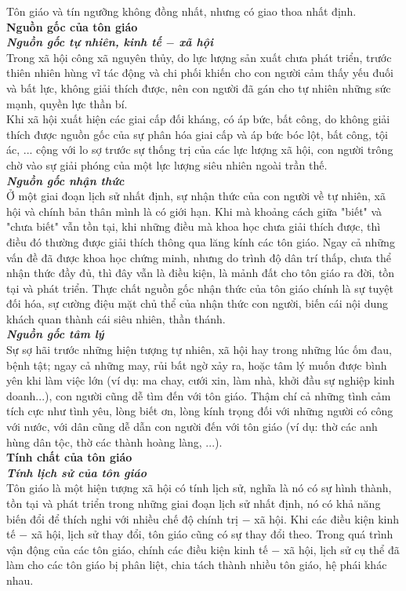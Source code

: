 Tôn giáo và tín ngưỡng không đồng nhất, nhưng có giao thoa nhất định.\\
\textbf{Nguồn gốc của tôn giáo}\\
\textbf{\textit{Nguồn gốc tự nhiên, kinh tế $-$ xã hội}}\\
Trong xã hội công xã nguyên thủy, do lực lượng sản xuất chưa phát triển, trước thiên nhiên hùng vĩ tác động và chi phối khiến cho con người cảm thấy yếu đuối và bất lực, không giải thích được, nên con người đã gán cho tự nhiên những sức mạnh, quyền lực thần bí.\\
Khi xã hội xuất hiện các giai cấp đối kháng, có áp bức, bất công, do không giải thích được nguồn gốc của sự phân hóa giai cấp và áp bức bóc lột, bất công, tội ác, ... cộng với lo sợ trước sự thống trị của các lực lượng xã hội, con người trông chờ vào sự giải phóng của một lực lượng siêu nhiên ngoài trần thế.\\
\textbf{\textit{Nguồn gốc nhận thức}}\\
Ở một giai đoạn lịch sử nhất định, sự nhận thức của con người về tự nhiên, xã hội và chính bản thân mình là có giới hạn. Khi mà khoảng cách giữa "biết" và "chưa biết" vẫn tồn tại, khi những điều mà khoa học chưa giải thích được, thì điều đó thường được giải thích thông qua lăng kính các tôn giáo. Ngay cả những vấn đề đã được khoa học chứng minh, nhưng do trình độ dân trí thấp, chưa thể nhận thức đầy đủ, thì đây vẫn là điều kiện, là mảnh đất cho tôn giáo ra đời, tồn tại và phát triển. Thực chất nguồn gốc nhận thức của tôn giáo chính là sự tuyệt đối hóa, sự cường điệu mặt chủ thể của nhận thức con người, biến cái nội dung khách quan thành cái siêu nhiên, thần thánh.\\
\textbf{\textit{Nguồn gốc tâm lý}}\\
Sự sợ hãi trước những hiện tượng tự nhiên, xã hội hay trong những lúc ốm đau, bệnh tật; ngay cả những may, rủi bất ngờ xảy ra, hoặc tâm lý muốn được bình yên khi làm việc lớn (ví dụ: ma chay, cưới xin, làm nhà, khởi đầu sự nghiệp kinh doanh...), con người cũng dễ tìm đến với tôn giáo. Thậm chí cả những tình cảm tích cực như tình yêu, lòng biết ơn, lòng kính trọng đối với những người có công với nước, với dân cũng dễ dẫn con người đến với tôn giáo (ví dụ: thờ các anh hùng dân tộc, thờ các thành hoàng làng, ...).\\
\textbf{Tính chất của tôn giáo}\\
\textbf{\textit{Tính lịch sử của tôn giáo}}\\
Tôn giáo là một hiện tượng xã hội có tính lịch sử, nghĩa là nó có sự hình thành, tồn tại và phát triển trong những giai đoạn lịch sử nhất định, nó có khả năng biến đổi để thích nghi với nhiều chế độ chính trị $-$ xã hội. Khi các điều kiện kinh tế $-$ xã hội, lịch sử thay đổi, tôn giáo cũng có sự thay đổi theo. Trong quá trình vận động của các tôn giáo, chính các điều kiện kinh tế $-$ xã hội, lịch sử cụ thể đã làm cho các tôn giáo bị phân liệt, chia tách thành nhiều tôn giáo, hệ phái khác nhau.\\
